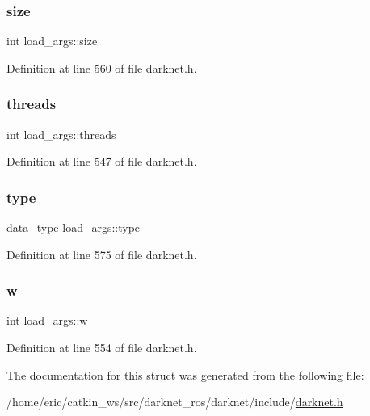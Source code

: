 \subsubsection{\texorpdfstring{size}{size}}
{\footnotesize\ttfamily int load\+\_\+args\+::size}



Definition at line 560 of file darknet.\+h.

\mbox{\label{structload__args_a3f6b3f3ef9406ab124550bc8166f2dcd}} 
\subsubsection{\texorpdfstring{threads}{threads}}
{\footnotesize\ttfamily int load\+\_\+args\+::threads}



Definition at line 547 of file darknet.\+h.

\mbox{\label{structload__args_a281729b932cef85bb4e2a88e1133518d}} 
\subsubsection{\texorpdfstring{type}{type}}
{\footnotesize\ttfamily \mbox{\hyperlink{darknet_8h_ac2ad7f431e3446fddcd9b6b9f93c4c14}{data\+\_\+type}} load\+\_\+args\+::type}



Definition at line 575 of file darknet.\+h.

\mbox{\label{structload__args_a936232a911399499924e00ba80ad16bf}} 
\subsubsection{\texorpdfstring{w}{w}}
{\footnotesize\ttfamily int load\+\_\+args\+::w}



Definition at line 554 of file darknet.\+h.



The documentation for this struct was generated from the following file\+:\begin{DoxyCompactItemize}
\item 
/home/eric/catkin\+\_\+ws/src/darknet\+\_\+ros/darknet/include/\mbox{\hyperlink{darknet_8h}{darknet.\+h}}\end{DoxyCompactItemize}
